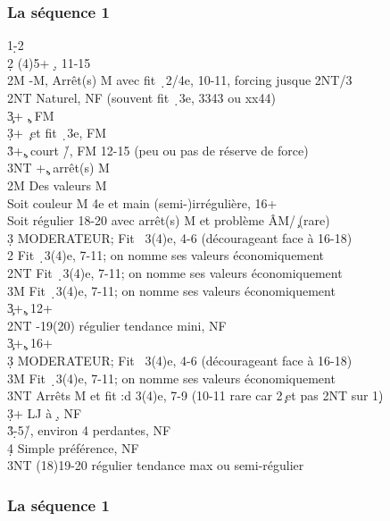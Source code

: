 \documentclass[a4paper]{article}
\begin{document}
\subsubsection{La séquence 1\pdfc}

\begin{bidtable}
1\d-2\c\\
2\d \> (4)5+ \d , 11-15\+\\
2M -M, Arrêt(s) M avec fit \d\ 2/4e, 10-11, forcing jusque 2NT/3\d \\
2NT \> Naturel, NF (souvent fit \d\ 3e, 3343 ou xx44)\\
3\c {}+ \c , FM\\
3\d {}+ \c\ et fit \d\ 3e, FM\\
3\h\s {}+\c , court \h /\s , FM 12-15 (peu ou pas de réserve de force)\\
3NT +\c , arrêt(s) M\-\\
2M \> Des valeurs M\+\\
Soit \> couleur M 4e et main (semi-)irrégulière, 16+\\
Soit \> régulier 18-20 avec arrêt(s) M et problème ÂM/\c\ (rare)\\
3\d \> MODERATEUR; Fit \s\ 3(4)e, 4-6 (décourageant face à 16-18)\\
2\s \> Fit \d\ 3(4)e, 7-11; on nomme ses valeurs économiquement\\
2NT \> Fit \d\ 3(4)e, 7-11; on nomme ses valeurs économiquement\\
3M \> Fit \d\ 3(4)e, 7-11; on nomme ses valeurs économiquement\\
3\c {}+\c , 12+\-\\
2NT -19(20) régulier tendance mini, NF\\
3\c {}+\c , 16+\+\\
3\d \> MODERATEUR; Fit \s\ 3(4)e, 4-6 (décourageant face à 16-18)\\
3M \> Fit \d\ 3(4)e, 7-11; on nomme ses valeurs économiquement\\
3NT \> Arrêts M et fit :d 3(4)e, 7-9 (10-11 rare car 2\c\ et pas 2NT sur 1\d )\-\\
3\d {}+ LJ à \d , NF\\
3\h\s {}\d -5\h /\s , environ 4 perdantes, NF\+\\
4\d \> Simple préférence, NF\-\\
3NT \> (18)19-20 régulier tendance max ou semi-régulier
\end{bidtable}

\subsubsection{La séquence 1\pdfd}
\end{document}
